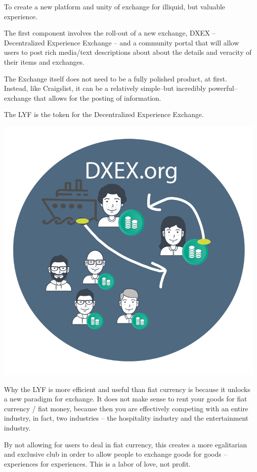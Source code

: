 \documentclass[11pt]{article}
\begin{document}
To create a new platform and unity of exchange for illiquid, but valuable experience.

The first component involves the roll-out of a new exchange, DXEX -- Decentralized Experience Exchange -- and a community portal that will allow users to post rich media/text descriptions about about the details and veracity of their items and exchanges.

The Exchange itself does not need to be a fully polished product, at first. Instead, like Craigslist, it can be a relatively simple--but incredibly powerful--exchange that allows for the posting of information. 

The LYF is the token for the Decentralized Experience Exchange.

\begin{center}
\includegraphics[width=.8\textwidth]{dex1.png}
\end{center}

Why the LYF is more efficient and useful than fiat currency is because it unlocks a new paradigm for exchange. It does not make sense to rent your goods for fiat currency / fiat money, because then you are effectively competing with an entire industry, in fact, two industries -- the hospitality industry and the entertainment industry.

By not allowing for users to deal in fiat currency, this creates a more egalitarian and exclusive club in order to allow people to exchange goods for goods -- experiences for experiences. This is a labor of love, not profit.
\end{document}
